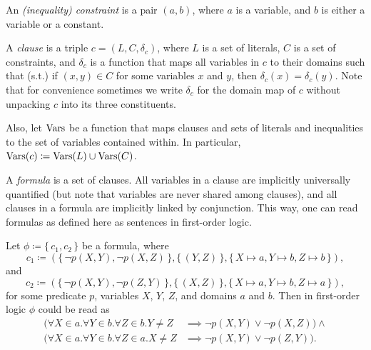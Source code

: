 \begin{definition}
  An \emph{(inequality) constraint} is a pair $(a, b)$, where $a$ is a variable,
  and $b$ is either a variable or a constant.
\end{definition}

\begin{definition}
  A \emph{clause} is a triple $c = (L, C, \delta_c)$, where $L$ is a set of
  literals, $C$ is a set of constraints, and $\delta_c$ is a function that maps
  all variables in $c$ to their domains such that (s.t.) if $(x, y) \in C$ for
  some variables $x$ and $y$, then $\delta_c(x) = \delta_c(y)$. Note that for
  convenience sometimes we write $\delta_c$ for the domain map of $c$ without
  unpacking $c$ into its three constituents.

  Also, let $\operatorname{Vars}$ be a function that maps clauses and sets of literals and
  inequalities to the set of variables contained within. In particular,
  $\operatorname{Vars}(c) \coloneqq \operatorname{Vars}(L) \cup \operatorname{Vars}(C)$.
\end{definition}

A \emph{formula} is a set of clauses. All variables in a clause are implicitly
universally quantified (but note that variables are never shared among clauses),
and all clauses in a formula are implicitly linked by conjunction. This way, one
can read formulas as defined here as sentences in first-order logic.

\begin{example} \label{example:first} Let $\phi \coloneqq \{\, c_1, c_2 \,\}$ be
  a formula, where
  \[
    c_1 \coloneqq (\{\, \neg p(X, Y), \neg p(X, Z) \,\}, \{\, (Y, Z) \,\}, \{\, X \mapsto a, Y \mapsto b, Z \mapsto b \,\}),
  \]
  and
  \[
    c_2 \coloneqq (\{\, \neg p(X, Y), \neg p(Z, Y) \,\}, \{\, (X, Z) \,\}, \{\, X \mapsto a, Y \mapsto b, Z \mapsto a \,\}),
  \]
  for some predicate $p$, variables $X$, $Y$, $Z$, and domains $a$ and $b$. Then
  in first-order logic $\phi$ could be read as
  \begin{align*}
    (\forall X \in a. \forall Y \in b. \forall Z \in b. Y \ne Z &\implies \neg p(X, Y) \lor \neg p(X, Z)) \land \\
    (\forall X \in a. \forall Y \in b. \forall Z \in a. X \ne Z &\implies \neg p(X, Y) \lor \neg p(Z, Y)).
  \end{align*}
\end{example}

